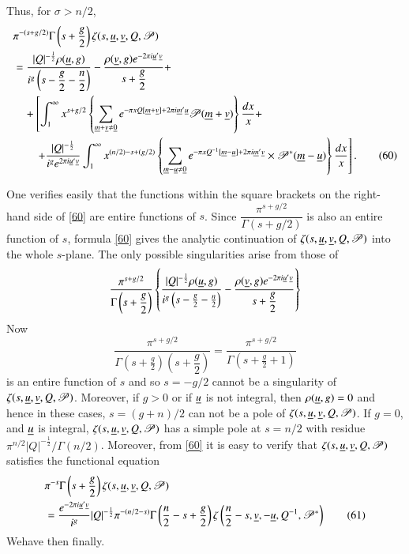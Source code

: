 Thus, for $\sigma>n/2$,
{\fontsize{9}{11}\selectfont
\begin{align*}
& \pi^{-(s+g/2)}\Gamma\left(s+\frac{g}{2}\right)\zeta(s,\underline{u},\underline{v},Q,\mathscr{P})\\
&=
\frac{|Q|^{-\frac{1}{2}}\rho(\underline{u},g)}{i^{g}\left(s-\dfrac{g}{2}-\dfrac{n}{2}\right)}-\frac{\rho(\underline{v},g)e^{-2\pi
    i\underline{u}'\underline{v}}}{s+\dfrac{g}{2}}+\\
&\quad
+\left[\int^{\infty}_{1}x^{s+g/2}\left\{\sum_{\underline{m}+\underline{v}\neq\underline{0}}e^{-\pi
    xQ[\underline{m}+\underline{v}]+2\pi
     i\underline{m}'\underline{u}}\mathscr{P}(\underline{m}+\underline{v})\right\}\frac{dx}{x}+\right.\\
&\qquad \left. +\frac{|Q|^{-\frac{1}{2}}}{i^{g}e^{2\pi
      i\underline{u}'\underline{v}}}\int^{\infty}_{1}x^{(n/2)-s+(g/2)}\left\{\sum_{\underline{m}-\underline{u}\neq
    \underline{0}}e^{-\pi xQ^{-1}[\underline{m}-\underline{u}]+2\pi
    i\underline{m}'\underline{v}}
\times
\mathscr{P}^{\ast}(\underline{m}-\underline{u})\right\}\frac{dx}{x}\right].\tag{60}\label{60} 
\end{align*}}\pageoriginale

One verifies easily that the functions within the square brackets on
the right-hand side of \eqref{60} are entire functions of $s$. Since
$\dfrac{\pi^{s+g/2}}{\Gamma(s+g/2)}$ is also an entire function of
$s$, formula \eqref{60} gives the analytic continuation of
$\zeta(s,\underline{u},\underline{v},Q,\mathscr{P})$ into the whole $s$-plane. The
only possible singularities arise from those of
$$
\frac{\pi^{s+g/2}}{\Gamma\left(s+\dfrac{g}{2}\right)}\left\{
\frac{|Q|^{-\frac{1}{2}}\rho(\underline{u},g)}{i^{g}\left(s-\frac{g}{2}-\frac{n}{2}\right)}-\frac{\rho(\underline{v},g)e^{-2\pi i\underline{u}'\underline{v}}}{s+\dfrac{g}{2}}\right\}
$$
Now
$$
\frac{\pi^{s+g/2}}{\Gamma\left(s+\frac{g}{2}\right)\left(s+\dfrac{g}{2}\right)}=\frac{\pi^{s+g/2}}{\Gamma\left(s+\frac{g}{2}+1\right)} 
$$
is an entire function of $s$ and so $s=-g/2$ cannot be a singularity
of $\zeta(s,\underline{u},\underline{v},Q,\mathscr{P})$. Moreover, if $g>0$ or if
$\underline{u}$ is not integral, then $\rho(\underline{u},g)=0$ and hence in these
cases, $s=(g+n)/2$ can not be a pole of
$\zeta(s,\underline{u},\underline{v},Q,\mathscr{P})$. If $g=0$, and $\underline{u}$ is
integral, $\zeta(s,\underline{u},\underline{v},Q,\mathscr{P})$ has a simple pole at
$s=n/2$ with residue
$\pi^{n/2}|Q|^{-\frac{1}{2}}/\Gamma(n/2)$. Moreover, from \eqref{60}
it is easy to verify that $\zeta(s,\underline{u},\underline{v},Q,\mathscr{P})$
satisfies the functional equation
\begin{align*}
& \pi^{-s}\Gamma\left(s+\frac{g}{2}\right)\zeta(s,\underline{u},\underline{v},Q,\mathscr{P})\\
&= \frac{e^{-2\pi
      i\underline{u}'\underline{v}}}{i^{g}}|Q|^{-\frac{1}{2}}\pi^{-(n/2-s)}\Gamma\left(\frac{n}{2}-s+\frac{g}{2}\right)\zeta\left(\frac{n}{2}-s,\underline{v},-\underline{u},Q^{-1},\mathscr{P}^{\ast}\right)\tag{61}\label{61} 
\end{align*}
We\pageoriginale have then finally.

